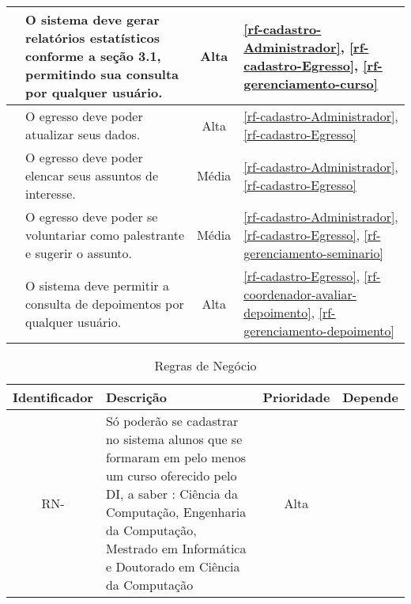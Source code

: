 \begin{landscape}
\begin{longtable}{|c|p{16.5cm}|c|p{2.3cm}|}
			\RF\label{rf-gerar-relatorio}  & O sistema deve gerar relatórios estatísticos conforme a seção 3.1, permitindo sua consulta por qualquer usuário. & Alta & \ref{rf-cadastro-Administrador}, \ref{rf-cadastro-Egresso}, \ref{rf-gerenciamento-curso} \\ \hline 
					
			\RF\label{rf-egresso-atualizar-dados} & O egresso deve poder atualizar seus dados. & Alta &  \ref{rf-cadastro-Administrador}, \ref{rf-cadastro-Egresso} \\\hline 
			
			\RF\label{rf-egresso-elencar-assuntos-interesse}  & O egresso deve poder elencar seus assuntos de interesse. & Média & \ref{rf-cadastro-Administrador}, \ref{rf-cadastro-Egresso} \\ \hline 
					
			\RF\label{rf-egresso-palestrante}  & O egresso deve poder se voluntariar como palestrante e sugerir o assunto. & Média & \ref{rf-cadastro-Administrador}, \ref{rf-cadastro-Egresso}, \ref{rf-gerenciamento-seminario} \\ \hline  
			
			\RF\label{rf-consulta-depoimento}  & O sistema deve permitir a consulta de depoimentos por qualquer usuário. & Alta &  \ref{rf-cadastro-Egresso}, \ref{rf-coordenador-avaliar-depoimento}, \ref{rf-gerenciamento-depoimento}\\ \hline  
 
 
\end{longtable}







\renewcommand*\therncount{RN-\arabic{rncount}}
\newcommand*\RN{\refstepcounter{rncount}\therncount}
\setcounter{rncount}{0}

\begin{longtable}{|c|p{16.5cm}|c|p{2.3cm}|}
			
			\caption{Regras de Negócio} \\ \hline \rowcolor[rgb]{0.8,0.8,0.8}
 			
 			Identificador & 	Descrição  &  Prioridade    & Depende  \\ \hline	
					
			\RN\label{rn-aluno-formado-DI}  & Só poderão se cadastrar no sistema alunos que se formaram em pelo menos um curso oferecido pelo DI, a saber : Ciência da Computação, Engenharia da Computação, Mestrado em Informática e Doutorado em Ciência da Computação & Alta & 	\\ \hline 
					

\end{longtable}
\end{landscape}
